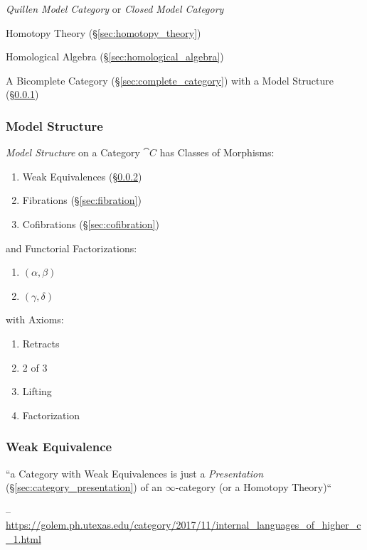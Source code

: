 \emph{Quillen Model Category} or \emph{Closed Model Category}

Homotopy Theory (\S\ref{sec:homotopy_theory})

Homological Algebra (\S\ref{sec:homological_algebra})

A Bicomplete Category (\S\ref{sec:complete_category}) with a Model
Structure (\S\ref{sec:model_structure})



\subsubsection{Model Structure}\label{sec:model_structure}

\emph{Model Structure} on a Category $\cat{C}$ has Classes of Morphisms:
\begin{enumerate}
  \item Weak Equivalences (\S\ref{sec:weak_equivalence})
  \item Fibrations (\S\ref{sec:fibration})
  \item Cofibrations (\S\ref{sec:cofibration})
\end{enumerate}
and Functorial Factorizations:
\begin{enumerate}
  \item $(\alpha,\beta)$
  \item $(\gamma,\delta)$
\end{enumerate}
with Axioms:
\begin{enumerate}
  \item Retracts
  \item 2 of 3
  \item Lifting
  \item Factorization
\end{enumerate} %




\subsubsection{Weak Equivalence}\label{sec:weak_equivalence}

``a Category with Weak Equivalences is just a \emph{Presentation}
(\S\ref{sec:category_presentation}) of an $\infty$-category (or a Homotopy
Theory)``

--\url{https://golem.ph.utexas.edu/category/2017/11/internal_languages_of_higher_c_1.html}



